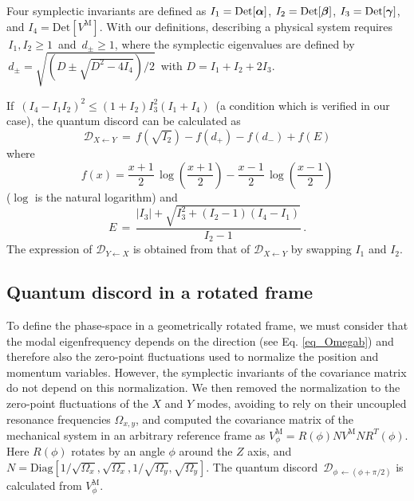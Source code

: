 \documentclass[11pt,floatfix,amssymb,prx,aps,longbibliography,superscriptaddress,nopacs]{revtex4-2}
\newcommand{\Vm}{V^{\scriptscriptstyle{\mathrm{M}}}}
\newcommand{\OmegaXY}{\Omega_{\scriptstyle{x,y}}}
\begin{document}
Four symplectic invariants are defined as $I_1=\mathrm{Det}[\mbox{\boldmath $\alpha$}]$, $I_2=\mathrm{Det}[\mbox{\boldmath $\beta$}]$, $I_3=\mathrm{Det}[\mbox{\boldmath $\gamma$}]$, and $I_4=\mathrm{Det}[\Vm]$. With our definitions, describing a physical system requires $\,I_1, I_2 \ge 1\,$ and $\,d_{\pm} \ge 1$, where the symplectic eigenvalues are defined by 
$\,d_{\pm} = \sqrt{(D \pm \sqrt{D^2-4 I_4} ) /2}\,$ 
with $D = I_1+I_2+2 I_3$. 

If $\,(I_4- I_1 I_2)^2\le (1+I_2) I_3^2 (I_1+I_4)\,$ (a condition which is verified in our case), the quantum discord can be calculated as
\begin{equation}
    \mathcal{D}_{X \leftarrow Y}\,=\,f\left(\sqrt{I_2}\right)-f\left(d_{+}\right)-f\left(d_{-}\right)+f\left(E\right)
\end{equation}
where 
\begin{equation}
    f(x) = \frac{x+1}{2} \,\log{\left(\frac{x+1}{2}\right)}-\frac{x-1}{2} \,\log{\left(\frac{x-1}{2}\right)}
\end{equation}
($\log$ is the natural logarithm) and
\begin{equation}
    E\,=\,\frac{|I_3| + \sqrt{I_3^2+\left(I_2-1\right)\left(I_4-I_1\right)}}{I_2-1}   \, .
\end{equation}
The expression of $\mathcal{D}_{Y \leftarrow X}$ is obtained from that of $\mathcal{D}_{X \leftarrow Y}$ by swapping $I_1$ and $I_2$.

\subsection*{Quantum discord in a rotated frame  }

To define the phase-space in a geometrically rotated frame, we must consider that the modal eigenfrequency depends on the direction (see Eq.
\ref{eq_Omegab}) 
and therefore also the zero-point fluctuations used to normalize the position and momentum variables. However, the symplectic invariants of the covariance matrix do not depend on this normalization.
We then removed the normalization to the zero-point fluctuations of the $X$ and $Y$ modes, avoiding to rely on their uncoupled resonance frequencies $\OmegaXY$, and computed the covariance matrix of the mechanical system in an arbitrary reference frame as $\Vm_{\scriptstyle{\phi}} = R(\phi) N \Vm N R^{\scriptstyle{T}}(\phi)$. Here $R(\phi)$ rotates by an angle $\phi$ around the $Z$ axis, and $N=\mathrm{Diag}[1/\sqrt{\Omega_x}, \sqrt{\Omega_x}, 1/\sqrt{\Omega_y}, \sqrt{\Omega_y}]$. The quantum discord $\,\mathcal{D}_{\phi \,\leftarrow (\phi+\pi/2)} $ is calculated from $\Vm_{\scriptstyle{\phi}}$. 
\end{document}
